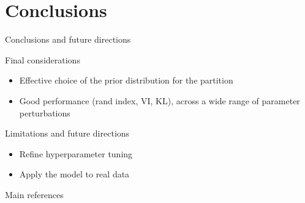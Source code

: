 \section{Conclusions}
\begin{frame}{Conclusions and future directions}


\alert{Final considerations}
\begin{itemize}
\item Effective choice of the prior distribution for the partition
\item Good performance (rand index, VI, KL), across a wide range of parameter perturbations
\end{itemize}

\pause 

\alert{Limitations and future directions}
\begin{itemize}
\item Refine hyperparameter tuning
\item Apply the model to real data
\end{itemize}

\end{frame}





\begin{frame}{Main references}
    \nocite{colombiLearningBlockStructured2022a}
    \nocite{mohammadiBayesianStructureLearning2015a}
    \nocite{legramantiExtendedStochasticBlock2022}
    \nocite{bensonAdaptiveMCMCMultiple2018}
    \nocite{martinezNonparametricChangePoint2014}
    
    \printbibliography
    \renewcommand*{\bibfont}{\small}
\end{frame}

